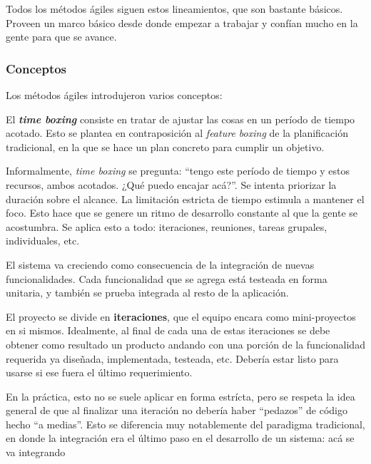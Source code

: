 \documentclass[]{article}
\begin{document}
Todos los métodos ágiles siguen estos lineamientos, que son bastante básicos. Proveen un marco básico desde donde empezar a trabajar y confían mucho en la gente para que se avance.

\subsubsection{Conceptos}
Los métodos ágiles introdujeron varios conceptos:

El \emph{\textbf{time boxing}} consiste en tratar de ajustar las cosas en un período de tiempo acotado. Esto se plantea en contraposición al \emph{feature boxing} de la planificación tradicional, en la que se hace un plan concreto para cumplir un objetivo.

Informalmente, \emph{time boxing} se pregunta: ``tengo este período de tiempo y estos recursos, ambos acotados. ¿Qué puedo encajar acá?''. Se intenta priorizar la duración sobre el alcance. La limitación estricta de tiempo estimula a mantener el foco. Esto hace que se genere un ritmo de desarrollo constante al que la gente se acostumbra. Se aplica esto a todo: iteraciones, reuniones, tareas grupales, individuales, etc.

El sistema va creciendo como consecuencia de la integración de nuevas funcionalidades. Cada funcionalidad que se agrega está testeada en forma unitaria, y también se prueba integrada al resto de la aplicación.

El proyecto se divide en \textbf{iteraciones}, que el equipo encara como mini-proyectos en si mismos. Idealmente, al final de cada una de estas iteraciones se debe obtener como resultado un producto andando con una porción de la funcionalidad requerida ya diseñada, implementada, testeada, etc. Debería estar listo para usarse si ese fuera el último requerimiento.

En la práctica, esto no se suele aplicar en forma estrícta, pero se respeta la idea general de que al finalizar una iteración no debería haber ``pedazos'' de código hecho ``a medias''. Esto se diferencia muy notablemente del paradigma tradicional, en donde la integración era el último paso en el desarrollo de un sistema: acá se va integrando
\end{document}
